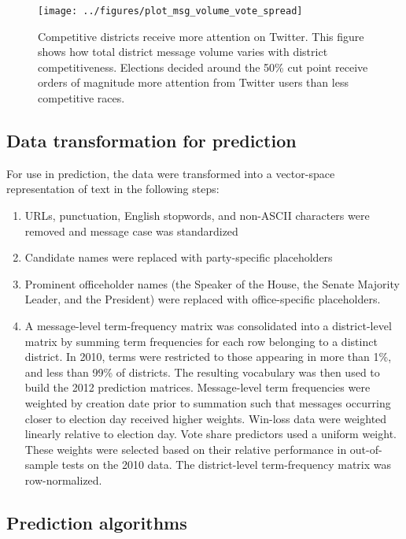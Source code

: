 \documentclass{article}
\begin{document}
\begin{figure}[ht]
  \centering
  \texttt{[image: ../figures/plot\_msg\_volume\_vote\_spread]}
  \caption{Competitive districts receive more attention on
    Twitter. This figure shows how total district message volume
    varies with district competitiveness. Elections decided around the
  50\% cut point receive orders of magnitude more attention from
  Twitter users than less competitive races.}
  \label{fig:msg-volume-vote-spread}
\end{figure}



\subsection{Data transformation for prediction}
\label{sec:data-transf-pred}

For use in prediction, the data were transformed into a vector-space
representation of text in the following steps:
\begin{enumerate}
\item URLs, punctuation, English stopwords, and non-ASCII characters were removed and
  message case was standardized
\item Candidate names were replaced with party-specific placeholders
\item Prominent officeholder names (the Speaker of the House, the Senate
  Majority Leader, and the President) were replaced with
  office-specific placeholders. 
\item A message-level term-frequency matrix
  was consolidated into a district-level matrix by summing term
  frequencies for each row belonging to a distinct district. In 2010,
  terms were restricted to those appearing in more than 1\%, and less
  than 99\% of districts. The resulting vocabulary was then used to build
  the 2012 prediction matrices. Message-level term frequencies were
  weighted by creation date prior to summation such that messages
  occurring closer to election day received higher weights. Win-loss data were
   weighted linearly relative to election
  day. Vote share 
  predictors used a uniform weight. These weights were
  selected based on their relative performance in out-of-sample tests
  on the 2010 data. The district-level term-frequency matrix was row-normalized.
\end{enumerate}

\subsection{Prediction algorithms}
\label{sec:pred-algor}
\end{document}
